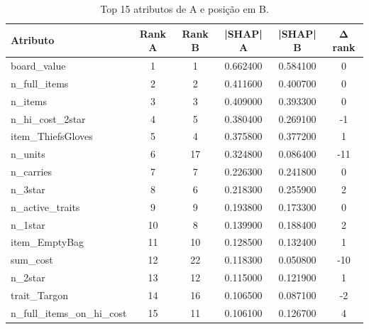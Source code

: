 \begin{table}[htbp]
\caption{Top 15 atributos de A e posição em B.}
\label{tab:abrank}
\centering
\small
\begin{tabular}{lccccc}
\toprule
Atributo & Rank A & Rank B & |SHAP| A & |SHAP| B & Δ rank \\
\midrule
board\_value & 1 & 1 & 0.662400 & 0.584100 & 0 \\
n\_full\_items & 2 & 2 & 0.411600 & 0.400700 & 0 \\
n\_items & 3 & 3 & 0.409000 & 0.393300 & 0 \\
n\_hi\_cost\_2star & 4 & 5 & 0.380400 & 0.269100 & -1 \\
item\_ThiefsGloves & 5 & 4 & 0.375800 & 0.377200 & 1 \\
n\_units & 6 & 17 & 0.324800 & 0.086400 & -11 \\
n\_carries & 7 & 7 & 0.226300 & 0.241800 & 0 \\
n\_3star & 8 & 6 & 0.218300 & 0.255900 & 2 \\
n\_active\_traits & 9 & 9 & 0.193800 & 0.173300 & 0 \\
n\_1star & 10 & 8 & 0.139900 & 0.188400 & 2 \\
item\_EmptyBag & 11 & 10 & 0.128500 & 0.132400 & 1 \\
sum\_cost & 12 & 22 & 0.118300 & 0.050800 & -10 \\
n\_2star & 13 & 12 & 0.115000 & 0.121900 & 1 \\
trait\_Targon & 14 & 16 & 0.106500 & 0.087100 & -2 \\
n\_full\_items\_on\_hi\_cost & 15 & 11 & 0.106100 & 0.126700 & 4 \\
\bottomrule
\end{tabular}
\end{table}
